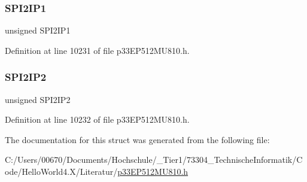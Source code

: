 \subsubsection{\texorpdfstring{S\+P\+I2\+I\+P1}{SPI2IP1}}
{\footnotesize\ttfamily unsigned S\+P\+I2\+I\+P1}



Definition at line 10231 of file p33\+E\+P512\+M\+U810.\+h.

\mbox{\label{structtag_i_p_c8_b_i_t_s_a06d7ae778a62ded206c078309bb0e3b8}} 
\subsubsection{\texorpdfstring{S\+P\+I2\+I\+P2}{SPI2IP2}}
{\footnotesize\ttfamily unsigned S\+P\+I2\+I\+P2}



Definition at line 10232 of file p33\+E\+P512\+M\+U810.\+h.



The documentation for this struct was generated from the following file\+:\begin{DoxyCompactItemize}
\item 
C\+:/\+Users/00670/\+Documents/\+Hochschule/\+\_\+\+Tier1/73304\+\_\+\+Technische\+Informatik/\+Code/\+Hello\+World4.\+X/\+Literatur/\hyperlink{p33_e_p512_m_u810_8h}{p33\+E\+P512\+M\+U810.\+h}\end{DoxyCompactItemize}
